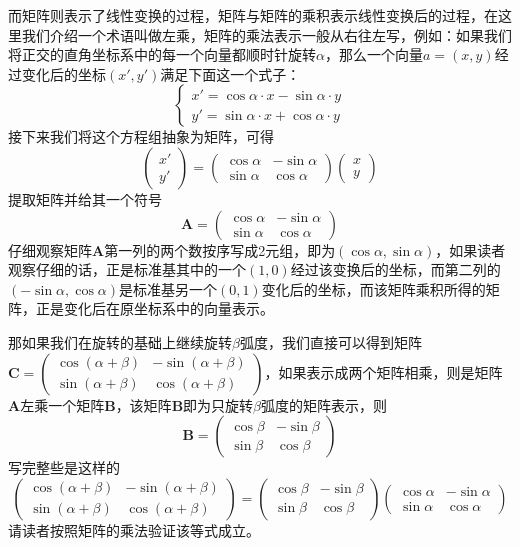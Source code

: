 而矩阵则表示了线性变换的过程，矩阵与矩阵的乘积表示线性变换后的过程，在这里我们介绍一个术语叫做左乘，矩阵的乘法表示一般从右往左写，例如：如果我们将正交的直角坐标系中的每一个向量都顺时针旋转$\alpha$，那么一个向量$a=(x,y)$经过变化后的坐标$(x',y')$满足下面这一个式子：
$$
\left\{\begin{matrix} 
	x'=\cos \alpha \cdot x-\sin \alpha \cdot y \\  
	y'=\sin \alpha \cdot x+\cos \alpha \cdot y
  \end{matrix}\right. 
$$
接下来我们将这个方程组抽象为矩阵，可得
$$
\begin{pmatrix}  
	x' \\  
	y'  
  \end{pmatrix} =\begin{pmatrix}  
	\cos \alpha & -\sin \alpha  \\  
	\sin \alpha & \cos \alpha   
  \end{pmatrix} \begin{pmatrix}  
	x \\  
	y
  \end{pmatrix} 
$$
提取矩阵并给其一个符号
$$
\mathbf{A}=\begin{pmatrix}  
	\cos \alpha & -\sin \alpha  \\  
	\sin \alpha & \cos \alpha   
  \end{pmatrix} 
$$
仔细观察矩阵$\mathbf{A}$第一列的两个数按序写成2元组，即为$(\cos \alpha,\sin \alpha)$，如果读者观察仔细的话，正是标准基其中的一个$(1,0)$经过该变换后的坐标，而第二列的$(-\sin \alpha,\cos \alpha)$是标准基另一个$(0,1)$变化后的坐标，而该矩阵乘积所得的矩阵，正是变化后在原坐标系中的向量表示。

那如果我们在旋转的基础上继续旋转$\beta$弧度，我们直接可以得到矩阵$\mathbf{C}=\begin{pmatrix}  
	\cos (\alpha+\beta) & -\sin (\alpha+\beta)  \\  
	\sin (\alpha+\beta) & \cos (\alpha+\beta) 
\end{pmatrix} $，如果表示成两个矩阵相乘，则是矩阵$\mathbf{A}$左乘一个矩阵$\mathbf{B}$，该矩阵$\mathbf{B}$即为只旋转$\beta$弧度的矩阵表示，则
$$
\mathbf{B}=\begin{pmatrix}  
	\cos \beta & -\sin \beta  \\  
	\sin \beta & \cos \beta   
  \end{pmatrix} 
$$
写完整些是这样的
$$
\begin{pmatrix}  
	\cos (\alpha+\beta) & -\sin (\alpha+\beta)  \\  
	\sin (\alpha+\beta) & \cos (\alpha+\beta) 
\end{pmatrix}=\begin{pmatrix}  
	\cos \beta & -\sin \beta  \\  
	\sin \beta & \cos \beta   
  \end{pmatrix} \begin{pmatrix}  
	\cos \alpha & -\sin \alpha  \\  
	\sin \alpha & \cos \alpha   
  \end{pmatrix} 
$$
请读者按照矩阵的乘法验证该等式成立。

